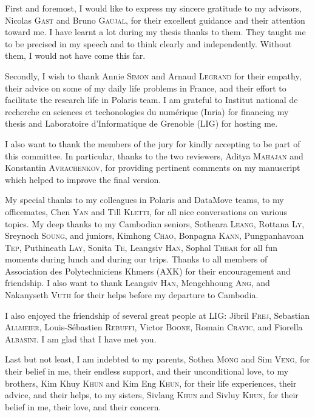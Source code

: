 

\vspace*{-5mm}
First and foremost, I would like to express my sincere gratitude to my advisors, Nicolas \textsc{Gast} and Bruno \textsc{Gaujal}, for their excellent guidance and their attention toward me.
I have learnt a lot during my thesis thanks to them.
They taught me to be precised in my speech and to think clearly and independently.
Without them, I would not have come this far.

Secondly, I wish to thank Annie \textsc{Simon} and Arnaud \textsc{Legrand} for their empathy, their advice on some of my daily life problems in France, and their effort to facilitate the research life in Polaris team. I am grateful to Institut national de recherche en sciences et techonologies du numérique (Inria) for financing my thesis and Laboratoire d'Informatique de Grenoble (LIG) for hosting me.

I also want to thank the members of the jury for kindly accepting to be part of this committee.
In particular, thanks to the two reviewers, Aditya \textsc{Mahajan} and Konstantin \textsc{Avrachenkov}, for providing pertinent comments on my manuscript which helped to improve the final version.

My special thanks to my colleagues in Polaris and DataMove teams, to my officemates, Chen \textsc{Yan} and Till \textsc{Kletti}, for all nice conversations on various topics.
My deep thanks to my Cambodian seniors, Sotheara \textsc{Leang}, Rottana \textsc{Ly}, Sreynoch \textsc{Soung}, and juniors, Kimhong \textsc{Chao}, Bonpagna \textsc{Kann}, Pungpanhavoan \textsc{Tep}, Puthineath \textsc{Lay}, Sonita \textsc{Te}, Leangsiv \textsc{Han}, Sophal \textsc{Thear} for all fun moments during lunch and during our trips.
Thanks to all members of Association des Polytechniciens Khmers (AXK) for their encouragement and friendship.
I also want to thank Leangsiv \textsc{Han}, Mengchhoung \textsc{Ang}, and Nakanyseth \textsc{Vuth} for their helps before my departure to Cambodia.

I also enjoyed the friendship of several great people at LIG: Jibril \textsc{Frej}, Sebastian \textsc{Allmeier}, Louis-Sébastien \textsc{Rebuffi}, Victor \textsc{Boone}, Romain \textsc{Cravic}, and Fiorella \textsc{Albasini}.
I am glad that I have met you.

Last but not least, I am indebted to my parents, Sothea \textsc{Mong} and Sim \textsc{Veng}, for their belief in me, their endless support, and their unconditional love, to my brothers, Kim Khuy \textsc{Khun} and Kim Eng \textsc{Khun}, for their life experiences, their advice, and their helps, to my sisters, Sivlang \textsc{Khun} and Sivluy \textsc{Khun}, for their belief in me, their love, and their concern.

%
%
